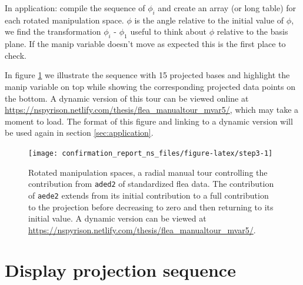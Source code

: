 \documentclass{monashthesis}
\begin{document}
In application: compile the sequence of \(\phi_i\) and create an array
(or long table) for each rotated manipulation space. \(\phi\) is the
angle relative to the initial value of \(\phi\), we find the
transformation \(\phi_i\) - \(\phi_1\) useful to think about \(\phi\)
relative to the basis plane. If the manip variable doesn't move as
expected this is the first place to check.

\begin{Shaded}
\begin{Highlighting}[]
 
\StringTok{ }\OperatorTok{+}\StringTok{ }
\StringTok{ }\NormalTok{(manip_space, theta, phi)[, }\OperatorTok{:}\NormalTok{]}
\NormalTok{\}}
\end{Highlighting}
\end{Shaded}

In figure \ref{fig:step3} we illustrate the sequence with 15 projected
bases and highlight the manip variable on top while showing the
corresponding projected data points on the bottom. A dynamic version of
this tour can be viewed online at
\url{https://nspyrison.netlify.com/thesis/flea_manualtour_mvar5/}, which
may take a moment to load. The format of this figure and linking to a
dynamic version will be used again in section \ref{sec:application}.









\begin{figure}

{\centering \texttt{[image: confirmation\_report\_ns\_files/figure-latex/step3-1]} 

}

\caption{Rotated manipulation spaces, a radial manual tour
controlling the contribution from \texttt{aded2} of standardized flea
data. The contribution of \texttt{aede2} extends from its initial
contribution to a full contribution to the projection before decreasing
to zero and then returning to its initial value. A dynamic version can
be viewed at
\url{https://nspyrison.netlify.com/thesis/flea_manualtour_mvar5/}.}\label{fig:step3}
\end{figure}

\section{Display projection sequence}\label{sec:display}
\end{document}
